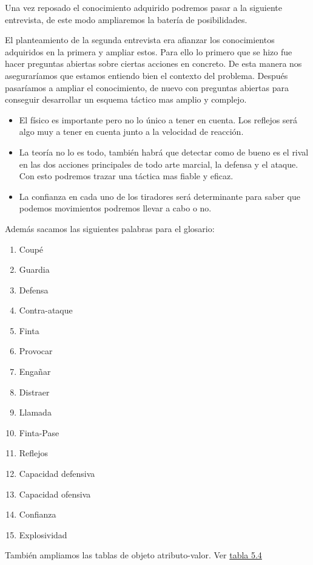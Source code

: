 Una vez reposado el conocimiento adquirido podremos pasar a la siguiente entrevista,
de este modo ampliaremos la batería de posibilidades.

El planteamiento de la segunda entrevista era afianzar los conocimientos adquiridos en
la primera y ampliar estos. Para ello lo primero que se hizo fue hacer preguntas abiertas
sobre ciertas acciones en concreto. De esta manera nos aseguraríamos que estamos entiendo
bien el contexto del problema. Después pasaríamos a ampliar el conocimiento, de nuevo
con preguntas abiertas para conseguir desarrollar un esquema táctico mas amplio y complejo.

\begin{itemize}
  \item El físico es importante pero no lo único a tener en cuenta. Los reflejos será
    algo muy a tener en cuenta junto a la velocidad de reacción.
  \item La teoría no lo es todo, también habrá que detectar como de bueno es el rival
    en las dos acciones principales de todo arte marcial, la defensa y el ataque.
    Con esto podremos trazar una táctica mas fiable y eficaz.
  \item La confianza en cada uno de los tiradores será determinante para saber
    que podemos movimientos podremos llevar a cabo o no.
\end{itemize}

Además sacamos las siguientes palabras para el glosario:

\begin{enumerate}
  \item Coupé
  \item Guardia
  \item Defensa
  \item Contra-ataque
  \item Finta
  \item Provocar
  \item Engañar
  \item Distraer
  \item Llamada
  \item Finta-Pase
  \item Reflejos
  \item Capacidad defensiva
  \item Capacidad ofensiva
  \item Confianza
  \item Explosividad
\end{enumerate}

También ampliamos las tablas de objeto atributo-valor. Ver \hyperref[tab:Tabla objeto atributo y valor ampliada]{tabla 5.4}

